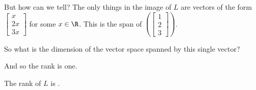 \documentclass{ximera}
\begin{document}
\begin{question}
\begin{solution}
\begin{hint}
\begin{question}
        But how can we tell?  The only things in the image of $L$ are
        vectors of the form $\begin{bmatrix} x \\ 2x \\
          3x \end{bmatrix}$ for some $x \in \R$.  This is the span of $\left(\begin{bmatrix} 1 \\ 2 \\
          3 \end{bmatrix}\right)$.

        So what is the dimension of the vector space spanned by this single vector?
        \begin{solution}
          \begin{multiple-choice}
          \end{multiple-choice}
        \end{solution}        
        
        And so the rank is one.
      \end{question}
    \end{hint}
    
    The rank of $L$ is .
  \end{solution}
\end{question}
\end{document}
